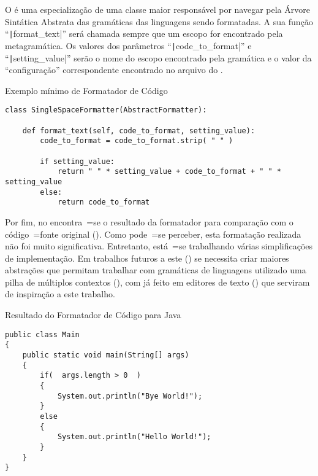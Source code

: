 O  é uma especialização de uma classe maior responsável por navegar pela Árvore Sintática Abstrata das gramáticas das linguagens sendo formatadas.
A sua função ``\texttt|format_text|'' será chamada sempre que um escopo for encontrado pela metagramática.
Os valores dos parâmetros ``\texttt|code_to_format|'' e
``\texttt|setting_value|'' serão o nome do escopo encontrado pela gramática e
o valor da ``configuração'' correspondente encontrado no arquivo do .
\begin{code}
\caption{Exemplo mínimo de Formatador de Código}
\label{code:exemploMinimoDeFormatadorDeCodigo}
\begin{verbatim}
class SingleSpaceFormatter(AbstractFormatter):

    def format_text(self, code_to_format, setting_value):
        code_to_format = code_to_format.strip( " " )

        if setting_value:
            return " " * setting_value + code_to_format + " " * setting_value
        else:
            return code_to_format
\end{verbatim}
\end{code}

Por fim,
no  encontra~=se o resultado da formatador para comparação com o código~=fonte original ().
Como pode~=se perceber,
esta formatação realizada não foi muito significativa.
Entretanto,
está~=se trabalhando várias simplificações de implementação.
Em trabalhos futuros a este () se necessita criar maiores abstrações que permitam trabalhar com gramáticas de linguagens utilizado uma pilha de múltiplos contextos (),
com já feito em editores de texto () que serviram de inspiração a este trabalho.
\begin{code}
\caption{Resultado do Formatador de Código para Java}
\label{code:resultadoDoFormatadorDeCodigoParaJava}
\begin{verbatim}
public class Main
{
    public static void main(String[] args)
    {
        if(  args.length > 0  )
        {
            System.out.println("Bye World!");
        }
        else
        {
            System.out.println("Hello World!");
        }
    }
}
\end{verbatim}
\end{code}

